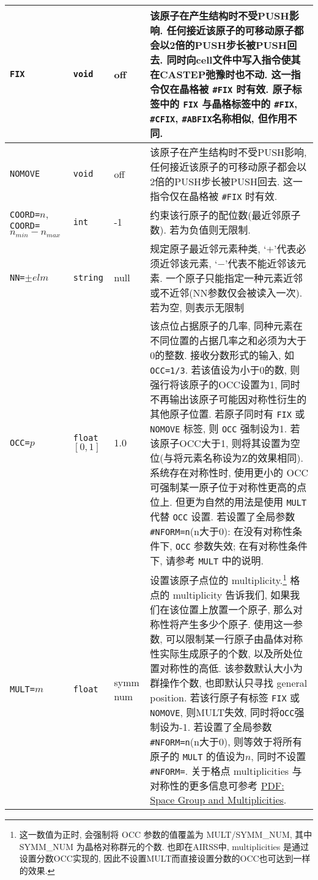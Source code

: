 \documentclass[a4paper, 10pt]{article}
\begin{document}
\begin{center}
\begin{longtable}{m{10em}|m{4em}<{\centering}|m{3em}<{\centering}|m{15em}}
\midrule
\verb|FIX| & \verb|void| & off & 该原子在产生结构时不受PUSH影响. 任何接近该原子的可移动原子都会以2倍的PUSH步长被PUSH回去. 同时向cell文件中写入指令使其在CASTEP弛豫时也不动. 这一指令仅在晶格被 \verb|#FIX| 时有效. 原子标签中的 \verb|FIX| 与晶格标签中的 \verb|#FIX|, \verb|#CFIX|, \verb|#ABFIX|名称相似, 但作用不同. \\
\midrule
\verb|NOMOVE| & \verb|void| & off & 该原子在产生结构时不受PUSH影响, 任何接近该原子的可移动原子都会以2倍的PUSH步长被PUSH回去. 这一指令仅在晶格被 \verb|#FIX| 时有效.\\
\midrule
\verb|COORD=|\(n\),\hspace{5em} \verb|COORD=|\(n_{min}-n_{max}\) & \verb|int| & -1 & 约束该行原子的配位数(最近邻原子数). 若为负值则无限制.\\
\midrule
\verb|NN=|\(\pm{}elm\)  & \verb|string| & null & 规定原子最近邻元素种类, `\(+\)'代表必须近邻该元素, `\(-\)'代表不能近邻该元素. 一个原子只能指定一种元素近邻或不近邻(NN参数仅会被读入一次). 若为空, 则表示无限制\\
\midrule
\verb|OCC=|\(p\) & \verb|float| \([0,1]\) & 1.0 & 该点位占据原子的几率, 同种元素在不同位置的占据几率之和必须为大于0的整数. 接收分数形式的输入, 如 \verb|OCC=1/3|. 若该值设为小于0的数, 则强行将该原子的OCC设置为1, 同时不再输出该原子可能因对称性衍生的其他原子位置. 若原子同时有 \verb|FIX| 或 \verb|NOMOVE| 标签, 则 \verb|OCC| 强制设为1. 若该原子OCC大于1, 则将其设置为空位(与将元素名称设为Z的效果相同). 系统存在对称性时, 使用更小的 OCC 可强制某一原子位于对称性更高的点位上. 但更为自然的用法是使用 \verb|MULT| 代替 \verb|OCC| 设置. 若设置了全局参数\verb|#NFORM=n|(n大于0): 在没有对称性条件下, \verb|OCC| 参数失效; 在有对称性条件下, 请参考 \verb|MULT| 中的说明. \\
\midrule
\verb|MULT=|\(m\) & \verb|float| & symm num & 设置该原子点位的 multiplicity.\footnote{这一数值为正时, 会强制将 OCC 参数的值覆盖为 MULT/SYMM\_NUM, 其中 SYMM\_NUM 为晶格对称群元的个数. 也即在AIRSS中, multiplicities 是通过设置分数OCC实现的, 因此不设置MULT而直接设置分数的OCC也可达到一样的效果.} 格点的 multiplicity 告诉我们, 如果我们在该位置上放置一个原子, 那么对称性将产生多少个原子. 使用这一参数, 可以限制某一行原子由晶体对称性实际生成原子的个数, 以及所处位置对称性的高低. 该参数默认大小为群操作个数, 也即默认只寻找 general position. 若该行原子有标签 \verb|FIX| 或 \verb|NOMOVE|, 则MULT失效, 同时将\verb|OCC|强制设为-1. 若设置了全局参数\verb|#NFORM=n|(n大于0), 则等效于将所有原子的 \verb|MULT| 的值设为\(n\), 同时不设置\verb|#NFORM=|. 关于格点 multiplicities 与对称性的更多信息可参考 \href{http://folk.ntnu.no/yingday/NilsYD/PhaseStructure/001Space_Groups.pdf}{PDF: Space Group and Multiplicities}.\\

\end{longtable}
\end{center}
\end{document}
